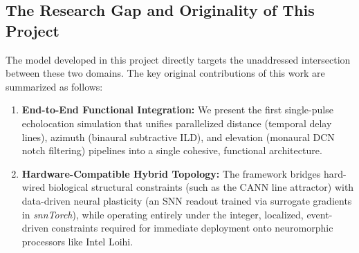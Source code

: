 \subsection{The Research Gap and Originality of This Project}
The model developed in this project directly targets the unaddressed intersection between these two domains. The key original contributions of this work are summarized as follows:

\begin{enumerate}
    \item \textbf{End-to-End Functional Integration:} We present the first single-pulse echolocation simulation that unifies parallelized distance (temporal delay lines), azimuth (binaural subtractive ILD), and elevation (monaural DCN notch filtering) pipelines into a single cohesive, functional architecture.
    \item \textbf{Hardware-Compatible Hybrid Topology:} The framework bridges hard-wired biological structural constraints (such as the CANN line attractor) with data-driven neural plasticity (an SNN readout trained via surrogate gradients in \textit{snnTorch}), while operating entirely under the integer, localized, event-driven constraints required for immediate deployment onto neuromorphic processors like Intel Loihi.
\end{enumerate}














